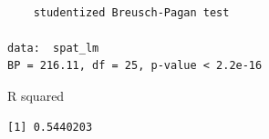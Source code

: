 \documentclass[
  letterpaper,
  DIV=11,
  numbers=noendperiod]{scrartcl}
\newenvironment{Shaded}{\begin{snugshade}}{\end{snugshade}}
\newcommand{\ConstantTok}[1]{\textcolor[rgb]{0.56,0.35,0.01}{#1}}
\newcommand{\DecValTok}[1]{\textcolor[rgb]{0.68,0.00,0.00}{#1}}
\newcommand{\FunctionTok}[1]{\textcolor[rgb]{0.28,0.35,0.67}{#1}}
\newcommand{\NormalTok}[1]{\textcolor[rgb]{0.00,0.23,0.31}{#1}}
\newcommand{\OtherTok}[1]{\textcolor[rgb]{0.00,0.23,0.31}{#1}}
\newcommand{\SpecialCharTok}[1]{\textcolor[rgb]{0.37,0.37,0.37}{#1}}
\begin{document}
\begin{verbatim}

    studentized Breusch-Pagan test

data:  spat_lm
BP = 216.11, df = 25, p-value < 2.2e-16
\end{verbatim}

R squared

\begin{Shaded}
\end{Shaded}

\begin{verbatim}
[1] 0.5440203
\end{verbatim}

\begin{Shaded}
\end{Shaded}
\end{document}
